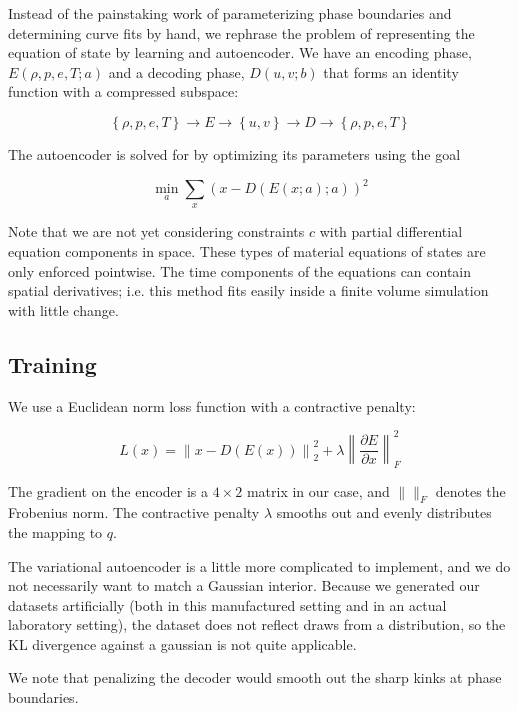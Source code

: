 \documentclass[]{article}
\begin{document}
Instead of the painstaking work of parameterizing phase boundaries and
determining curve fits by hand, we rephrase the problem of representing
the equation of state by learning and autoencoder. We have an encoding
phase, \(E(\rho,p,e,T; a)\) and a decoding phase, \(D(u,v; b)\) that
forms an identity function with a compressed subspace:

\begin{equation}
\left\{ \rho, p, e, T \right\} \rightarrow  E \rightarrow \left\{ u,v \right\} \rightarrow D \rightarrow \left\{ \rho, p, e, T \right\}
\end{equation}

The autoencoder is solved for by optimizing its parameters using the
goal

\begin{equation}
\min_a \sum_x \left( x - D(E(x;a);a) \right)^2
\end{equation}

Note that we are not yet considering constraints \(c\) with partial
differential equation components in space. These types of material
equations of states are only enforced pointwise. The time components of
the equations can contain spatial derivatives; i.e. this method fits
easily inside a finite volume simulation with little change.

\hypertarget{header-n3305}{%
\subsection{Training}\label{header-n3305}}

We use a Euclidean norm loss function with a contractive penalty:

\[L(x)=\left\|x-D(E(x))\right\|^2_2+\lambda\left\|\frac{\partial E}{\partial x}\right\|_F^2\]

The gradient on the encoder is a \(4\times2\) matrix in our case, and
\(\|\|_F\) denotes the Frobenius norm. The contractive penalty
\(\lambda\) smooths out and evenly distributes the mapping to \(q\).

The variational autoencoder is a little more complicated to implement,
and we do not necessarily want to match a Gaussian interior. Because we
generated our datasets artificially (both in this manufactured setting
and in an actual laboratory setting), the dataset does not reflect draws
from a distribution, so the KL divergence against a gaussian is not
quite applicable.

We note that penalizing the decoder would smooth out the sharp kinks at
phase boundaries.
\end{document}
